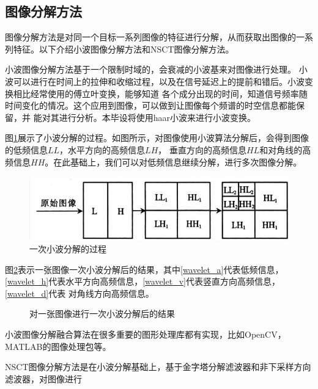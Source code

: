 \documentclass{xduugthesis}
\begin{document}
\subsection{图像分解方法}
图像分解方法是对同一个目标一系列图像的特征进行分解，从而获取出图像的一系列特征。以下介绍小波图像分解方法和NSCT图像分解方法。\par
小波图像分解方法\cite{Wavelet_Merge}基于一个限制时域的，会衰减的小波基来对图像进行处理。
小波可以进行在时间上的拉伸和收缩过程，以及在信号延迟上的提前和错后。小波变换相比经常使用的傅立叶变换，能够知道
各个成分出现的时间，知道信号频率随时间变化的情况。这个应用到图像，可以做到让图像每个频谱的时空信息都能保留，并
能对其进行分析。本毕设将使用haar小波\cite{Haar}来进行小波变换。\par
图\ref{Wavelet_Process_Image}展示了小波分解的过程。如图所示，对图像使用小波算法分解后，会得到图像的低频信息$LL$，水平方向的高频信息$LH$，
垂直方向的高频信息$HL$和对角线的高频信息$HH$。在此基础上，我们可以对低频信息继续分解，进行多次图像分解。\par
\begin{figure}[ht!]
	\centering
	\includegraphics[scale=0.25]{img/wavelet.png}
	\caption{一次小波分解的过程}\label{Wavelet_Process_Image}
\end{figure}
图\ref{Wavelet_Solution_Image}表示一张图像一次小波分解后的结果，其中\ref{wavelet_a}代表低频信息，
\ref{wavelet_h}代表水平方向高频信息，\ref{wavelet_v}代表竖直方向高频信息，\ref{wavelet_d}代表
对角线方向高频信息。\par
\begin{figure}[ht!]
	\centering
	\caption{对一张图像进行一次小波分解后的结果}\label{Wavelet_Solution_Image}
\end{figure}
小波图像分解融合算法在很多重要的图形处理库都有实现，比如OpenCV，MATLAB的图像处理包等。\par
NSCT图像分解方法\cite{NSCT_Merge}是在小波分解基础上，基于金字塔分解滤波器和非下采样方向滤波器，对图像进行
\end{document}
